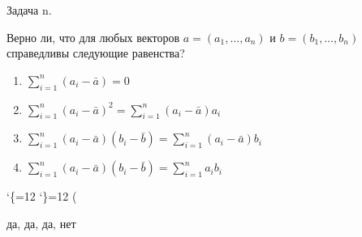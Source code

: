 \documentclass[12pt]{article}
\newenvironment{problem}{Задача n.


}{}
\newenvironment{solution}{%
  \catcode`\{=12
  \catcode`\}=12
  \DoNull
}{%
  \ignorespacesafterend
}
\newcommand\DoNull()
\begin{document}
\begin{problem}
 Верно ли, что для любых векторов $a = (a_1,\dots,a_n)$ и $b = (b_1,\dots,b_n)$ справедливы следующие равенства?
\begin{enumerate}
\item $\sum_{i=1}^n {(a_i-\bar a)} = 0$
\item $\sum_{i=1}^n {(a_i-\bar a)^2} = \sum_{i=1}^n {(a_i-\bar a)a_i}$
\item $\sum_{i=1}^n {(a_i-\bar a)(b_i-\bar b)} = \sum_{i=1}^n {(a_i-\bar a)b_i}$
\item $\sum_{i=1}^n {(a_i-\bar a)(b_i-\bar b)} = \sum_{i=1}^n {a_i b_i}$
\end{enumerate}
\end{problem}

\begin{solution}
 да, да, да, нет
\end{solution}
\end{document}

